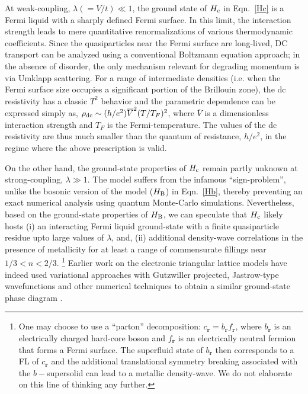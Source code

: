 \documentclass[aps,prx,onecolumn,amsmath,nofootinbib,amssymb,11pt]{revtex4-1}
\renewcommand{\vec}[1]{\boldsymbol{#1}}
\def \r {{\vec r}}
\def \tn {\textnormal}
\def \hb {H_{\tn{B}}}
\def \hc {H_{\tn{c}}}
\newcommand{\JFM}[1]{ { \color{blue} \footnotesize (\textsf{JFM}) \textsf{\textsl{#1}} } }
\begin{document}
At weak-coupling, $\lambda(=V/t)\ll 1$, the ground state of $\hc$ in Eqn.~\ref{Hc} is a Fermi liquid with a sharply defined Fermi surface. In this limit, the interaction strength leads to mere quantitative renormalizations of various thermodynamic coefficients. Since the quasiparticles near the Fermi surface are long-lived, DC transport can be analyzed using a conventional Boltzmann equation approach; in the absence of disorder, the only mechanism relevant for degrading momentum is via Umklapp scattering. For a range of intermediate densities (i.e. when the Fermi surface size occupies a significant portion of the Brillouin zone), the dc resistivity has a classic $T^2$ behavior and the parametric dependence can be expressed simply as, $\rho_{\tn{dc}}\sim (h/e^2) \overline{V}^2 (T/T_F)^2$, where $\overline{V}$ is a dimensionless interaction strength and $T_F$ is the Fermi-temperature. The values of the dc resistivity are thus much smaller than the quantum of resistance, $h/e^2$, in the regime where the above prescription is valid.

On the other hand, the ground-state properties of $\hc$ remain partly unknown at strong-coupling, $\lambda\gg1$. The model suffers from the infamous ``sign-problem'', unlike the bosonic version of the model ($\hb$) in Eqn.~\ref{Hb}, thereby preventing an exact numerical analysis using quantum Monte-Carlo simulations. Nevertheless, based on the ground-state properties of $\hb$, we can speculate that $\hc$ likely hosts (i) an interacting Fermi liquid ground-state with a finite quasiparticle residue upto large values of $\lambda$, and, (ii) additional density-wave correlations in the presence of metallicity for at least a range of commensurate fillings near $1/3<n<2/3$. {\footnote{\textsf{One may choose to use a ``parton'' decomposition: $c_\r = b_\r f_\r$, where $b_\r$ is an electrically charged hard-core boson and $f_\r$ is an electrically neutral fermion that forms a Fermi surface. The superfluid state of $b_\r$ then corresponds to a FL of $c_\r$ and the additional translational symmetry breaking associated with the $b-$supersolid \cite{melko,troyer,damle} can lead to a metallic density-wave. We do not elaborate on this line of thinking any further.}}} Earlier work on the electronic triangular lattice models have indeed used variational approaches with Gutzwiller projected, Jastrow-type wavefunctions and other numerical techniques to obtain a similar ground-state phase diagram \cite{MotrunichLee2003VMC, Tocchio,cryst2031155}.


\end{document}
